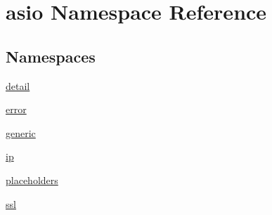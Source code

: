 \hypertarget{namespaceasio}{}\section{asio Namespace Reference}
\label{namespaceasio}
\subsection*{Namespaces}
\begin{DoxyCompactItemize}
\item 
 \hyperlink{namespaceasio_1_1detail}{detail}
\item 
 \hyperlink{namespaceasio_1_1error}{error}
\item 
 \hyperlink{namespaceasio_1_1generic}{generic}
\item 
 \hyperlink{namespaceasio_1_1ip}{ip}
\item 
 \hyperlink{namespaceasio_1_1placeholders}{placeholders}
\item 
 \hyperlink{namespaceasio_1_1ssl}{ssl}
\end{DoxyCompactItemize}
